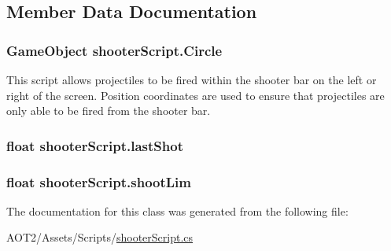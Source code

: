 \subsection{Member Data Documentation}
\hypertarget{classshooter_script_aec5b91ec83c6e5326f9f251f46411367}{
\subsubsection[{Circle}]{\setlength{\rightskip}{0pt plus 5cm}Game\-Object shooter\-Script.\-Circle}}\label{classshooter_script_aec5b91ec83c6e5326f9f251f46411367}
This script allows projectiles to be fired within the shooter bar on the left or right of the screen. Position coordinates are used to ensure that projectiles are only able to be fired from the shooter bar. \hypertarget{classshooter_script_a3b49886ffefc2a63ad5cb5995da709b4}{
\subsubsection[{last\-Shot}]{\setlength{\rightskip}{0pt plus 5cm}float shooter\-Script.\-last\-Shot\hspace{0.3cm}{\ttfamily [private]}}}\label{classshooter_script_a3b49886ffefc2a63ad5cb5995da709b4}
\hypertarget{classshooter_script_a35395b1d291048e31353f9300c4e61be}{
\subsubsection[{shoot\-Lim}]{\setlength{\rightskip}{0pt plus 5cm}float shooter\-Script.\-shoot\-Lim}}\label{classshooter_script_a35395b1d291048e31353f9300c4e61be}


The documentation for this class was generated from the following file\-:\begin{DoxyCompactItemize}
\item 
A\-O\-T2/\-Assets/\-Scripts/\hyperlink{shooter_script_8cs}{shooter\-Script.\-cs}\end{DoxyCompactItemize}
